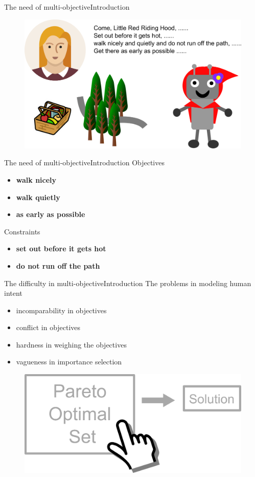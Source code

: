 \begin{frame}{The need of multi-objective}{Introduction}
	\begin{figure}
		\centering
		\includegraphics[width=\linewidth]{figure/task_assign}
		\label{fig:task_assign}
	\end{figure}
\end{frame}

\begin{frame}{The need of multi-objective}{Introduction}
Objectives
\begin{itemize}
\item \textbf{walk nicely}
\item \textbf{walk quietly}
\item \textbf{as early as possible}
\end{itemize}
Constraints
\begin{itemize}
\item  \textbf{set out before it gets hot}
\item \textbf{do not run off the path}
\end{itemize}
\end{frame}

\begin{frame}{The difficulty in multi-objective}{Introduction}
The problems in modeling human intent
\begin{itemize}
\item incomparability in objectives
\item conflict in objectives
\item hardness in weighing the objectives
\item vagueness in importance selection
\end{itemize}
\begin{figure}
	\centering
	\includegraphics[width=0.6\linewidth]{figure/human_interactive_moo}
	\label{fig:human_interactive_moo}
\end{figure}
\end{frame}

